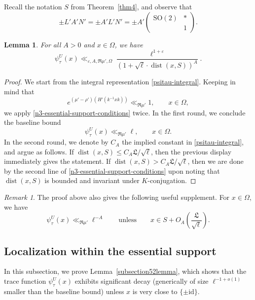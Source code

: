 \documentclass[11pt,oneside]{amsart}
\numberwithin{equation}{section}
\theoremstyle{remark}
\newtheorem{remark}{Remark}
\theoremstyle{plain}
\newtheorem{lemma}{Lemma}
\DeclareMathOperator{\dist}{dist}
\newcommand\SO{\mathrm{SO}}
\newcommand\id{\mathrm{id}}
\newcommand\eps{\varepsilon}
\renewcommand\leq{\leqslant}
\begin{document}
Recall the notation $S$ from Theorem~\ref{thm4}, and observe that
\begin{equation}\label{eq:recallHS}
\pm L'A'N' = \pm A'L'N' = \pm A' \begin{pmatrix} \SO(2) & * \\ & 1 \end{pmatrix}.
\end{equation}
\begin{lemma}
\label{n3-essential-support-lemma}
For all $A>0$ and $x\in\Omega$, we have
\[
\psi_{\tau}^{U}(x)\ll_{\eps,A,\Re\mu',\Omega}\frac{\ell^{1+\eps}}{(1+\sqrt{\ell} \cdot \dist(x,S))^{A}}.
\]
\end{lemma}
\begin{proof} We start from the integral representation \eqref{psitau-integral}. Keeping in mind that
\[
e^{(\mu'-\rho')(H'(k^{-1}xk))}\ll_{\Re\mu'} 1,\qquad x\in\Omega,
\]
we apply \eqref{n3-essential-support-conditions} twice. In the first round, we conclude the baseline bound
\[
\psi_{\tau}^{U}(x)\ll_{\Re\mu'} \ell,\qquad x\in \Omega.
\]
In the second round, we denote by $C_A$ the implied constant in \eqref{psitau-integral}, and argue as follows. If $\dist(x,S)\leq C_A\mathfrak{L}/\sqrt{\ell}$, then the previous display immediately gives the statement. If $\dist(x,S)> C_A\mathfrak{L}/\sqrt{\ell}$, then we are done by the second line of \eqref{n3-essential-support-conditions}  upon noting that $\dist(x,S)$ is bounded and invariant under $K$-conjugation.
\end{proof}
\begin{remark}\label{rmk:supplement} The proof above also gives the following useful supplement. For $x\in \Omega$, we have
\[
\psi_{\tau}^{U}(x) \ll_{\Re\mu'} \ell^{-A} \qquad \text{unless} \qquad x\in S+O_A\left( \frac{\mathfrak{L}}{\sqrt{\ell}}\right).
\]
\end{remark}

\subsection{Localization within the essential support}
\label{n3-localization-subsec}

In this subsection, we prove Lemma~\ref{subsection52lemma}, which shows that the trace function $\psi_{\tau}^U(x)$ exhibits significant decay (generically of size $\ell^{-1+o(1)}$ smaller than the baseline bound) unless $x$ is very close to $\{\pm\id\}$.
\end{document}
